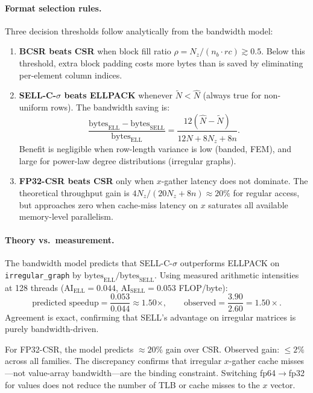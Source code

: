 \documentclass[11pt]{article}
\begin{document}
\paragraph{Format selection rules.}
Three decision thresholds follow analytically from the bandwidth model:

\begin{enumerate}
  \item \textbf{BCSR beats CSR} when block fill ratio
  $\rho = N_z/(n_b \cdot rc) \gtrsim 0.5$.  Below this threshold, extra
  block padding costs more bytes than is saved by eliminating per-element
  column indices.

  \item \textbf{SELL-C-$\sigma$ beats ELLPACK} whenever $\tilde{N} < \hat{N}$
  (always true for non-uniform rows). The bandwidth saving is:
  \[
    \frac{\text{bytes}_\text{ELL} - \text{bytes}_\text{SELL}}
         {\text{bytes}_\text{ELL}}
    = \frac{12(\hat{N}-\tilde{N})}{12\hat{N}+8N_z+8n}.
  \]
  Benefit is negligible when row-length variance is low (banded, FEM),
  and large for power-law degree distributions (irregular graphs).

  \item \textbf{FP32-CSR beats CSR} only when $x$-gather latency does not
  dominate.  The theoretical throughput gain is $4N_z/(20N_z+8n) \approx 20\%$
  for regular access, but approaches zero when cache-miss latency on $x$
  saturates all available memory-level parallelism.
\end{enumerate}

\paragraph{Theory vs.\ measurement.}
The bandwidth model predicts that SELL-C-$\sigma$ outperforms ELLPACK on
\texttt{irregular\_graph} by $\text{bytes}_\text{ELL}/\text{bytes}_\text{SELL}$.
Using measured arithmetic intensities at 128 threads
($\text{AI}_\text{ELL}=0.044$, $\text{AI}_\text{SELL}=0.053$ FLOP/byte):
\[
  \text{predicted speedup} = \frac{0.053}{0.044} \approx 1.50\times,
  \qquad
  \text{observed} = \frac{3.90}{2.60} = 1.50\times.
\]
Agreement is exact, confirming that SELL's advantage on irregular matrices
is purely bandwidth-driven.

For FP32-CSR, the model predicts $\approx 20\%$ gain over CSR.
Observed gain: $\leq 2\%$ across all families.  The discrepancy confirms
that irregular $x$-gather cache misses---not value-array bandwidth---are
the binding constraint.  Switching fp64$\to$fp32 for values does not
reduce the number of TLB or cache misses to the $x$ vector.
\end{document}
